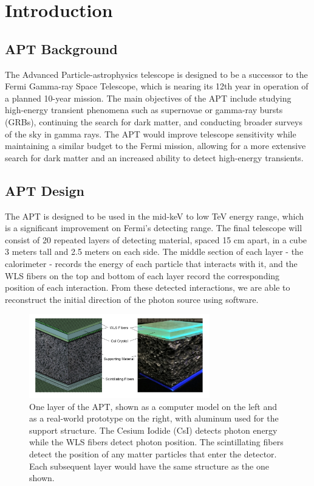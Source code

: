 \chapter{Introduction}
\label{cpt:format}


\section{APT Background}

The Advanced Particle-astrophysics telescope is designed to be a successor to the Fermi Gamma-ray Space Telescope, which is nearing its 12th year in operation of a planned 10-year mission. The main objectives of the APT include studying high-energy transient phenomena such as supernovae or gamma-ray bursts (GRBs), continuing the search for dark matter, and conducting broader surveys of the sky in gamma rays. The APT would improve telescope sensitivity while maintaining a similar budget to the Fermi mission, allowing for a more extensive search for dark matter and an increased ability to detect high-energy transients.

\section{APT Design}

The APT is designed to be used in the mid-keV to low TeV energy range, which is a significant improvement on Fermi's detecting range. The final telescope will consist of 20 repeated layers of detecting material, spaced 15 cm apart, in a cube 3 meters tall and 2.5 meters on each side. The middle section of each layer - the calorimeter - records the energy of each particle that interacts with it, and the WLS fibers on the top and bottom of each layer record the corresponding position of each interaction. From these detected interactions, we are able to reconstruct the initial direction of the photon source using software.

\begin{figure}
    \centering
    \includegraphics[width=0.7\textwidth]{APT_layers.png}
    \caption{One layer of the APT, shown as a computer model on the left and as a real-world prototype on the right, with aluminum used for the support structure. The Cesium Iodide (CsI) detects photon energy while the WLS fibers detect photon position. The scintillating fibers detect the position of any matter particles that enter the detector. Each subsequent layer would have the same structure as the one shown. \cite{APTmemo}}
    \label{fig:APT_layer}
\end{figure}


